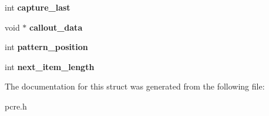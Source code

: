 \begin{DoxyCompactItemize}
\item 
\hypertarget{structpcre__callout__block_a989a280260effb9bf1521046a2507643}{int {\bfseries capture\-\_\-last}}\label{structpcre__callout__block_a989a280260effb9bf1521046a2507643}

\item 
\hypertarget{structpcre__callout__block_a45304eee0f48c835714a82fa762bab1c}{void $\ast$ {\bfseries callout\-\_\-data}}\label{structpcre__callout__block_a45304eee0f48c835714a82fa762bab1c}

\item 
\hypertarget{structpcre__callout__block_ac5caf602fa5ab812f8721451320b7adf}{int {\bfseries pattern\-\_\-position}}\label{structpcre__callout__block_ac5caf602fa5ab812f8721451320b7adf}

\item 
\hypertarget{structpcre__callout__block_a9360879d608b622daef0c7d1cf2606be}{int {\bfseries next\-\_\-item\-\_\-length}}\label{structpcre__callout__block_a9360879d608b622daef0c7d1cf2606be}

\end{DoxyCompactItemize}


\-The documentation for this struct was generated from the following file\-:\begin{DoxyCompactItemize}
\item 
pcre.\-h\end{DoxyCompactItemize}
